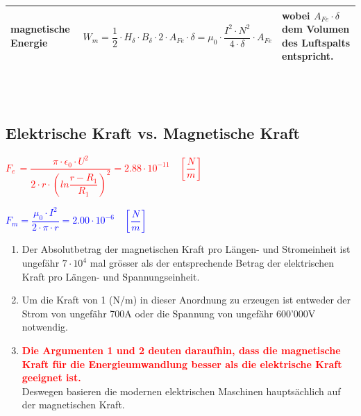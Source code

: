 \newpage
\begin{tabular}{|C{5cm}|P{7cm}|P{6cm}|}
	\hline

\textbf{magnetische Energie} & \begin{equation*}
W_m = \dfrac{1}{2}\cdot H_\delta\cdot B_\delta\cdot2\cdot A_{Fe}\cdot\delta = \mu_0\cdot \dfrac{I^2\cdot N^2}{4\cdot\delta}\cdot A_{Fe}
\end{equation*} & wobei $A_{Fe}\cdot\delta$ dem Volumen des Luftspalts entspricht. \\
\hline
\end{tabular} 
\\
\\
\subsection{Elektrische Kraft vs. Magnetische Kraft}
\begin{minipage}{0.5\textwidth}
	\centering
\textcolor{red}{$F_e\, = \dfrac{\pi\cdot\epsilon_0\cdot U^2}{2\cdot r\cdot\left(ln\dfrac{r-R_1}{R_1}\right)^2} = 2.88\cdot 10^{-11} \quad \left[\dfrac{N}{m}\right]$}
\end{minipage}
\begin{minipage}{0.5\textwidth}
	\centering
\textcolor{blue}{$F_m = \dfrac{\mu_0\cdot I^2}{2\cdot\pi\cdot r} = 2.00 \cdot 10^{-6} \quad\left[\dfrac{N}{m}\right]$}
\end{minipage}
\begin{enumerate}
	\item Der Absolutbetrag der magnetischen Kraft pro Längen- und Stromeinheit ist
	ungefähr $7\cdot10^4$ mal grösser als der entsprechende Betrag der elektrischen Kraft
	pro Längen- und Spannungseinheit.
	\item Um die Kraft von 1 (N/m) in dieser Anordnung zu erzeugen ist entweder der
	Strom von ungefähr 700A oder die Spannung von ungefähr 600’000V notwendig.
	\item \textcolor{red}{\textbf{Die Argumenten 1 und 2 deuten daraufhin, dass die magnetische Kraft für die Energieumwandlung besser als die elektrische Kraft geeignet ist.}}\\[0.2cm]
	Deswegen basieren die modernen elektrischen Maschinen hauptsächlich auf der magnetischen Kraft.
\end{enumerate}
\newpage